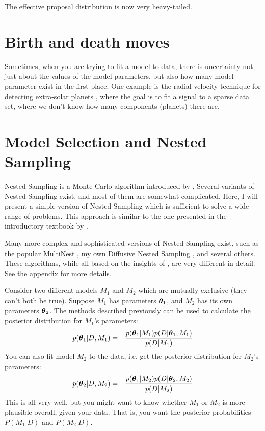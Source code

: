 The effective proposal distribution is now very heavy-tailed.



\section{Birth and death moves}
Sometimes, when you are trying to fit a model to data, there is uncertainty
not just about the values of the model parameters, but also how many model
parameter exist in the first place. One example is
the radial velocity technique for detecting extra-solar planets
\citep{gregory}, where the goal is to fit a signal to a sparse data set, where
we don't know how many components (planets) there are.



\section{Model Selection and Nested Sampling}
Nested Sampling is a Monte Carlo algorithm introduced by \citet{skilling}.
Several variants of Nested Sampling exist, and most of them are somewhat
complicated. Here, I will present a simple version of Nested Sampling which
is sufficient to solve a wide range of problems. This approach is similar to
the one presented in the introductory textbook by \citet{sivia}.

Many more complex and sophisticated versions of
Nested Sampling exist, such as the popular MultiNest \citep{multinest},
my own Diffusive Nested Sampling \citep{dnest}, and several others. These
algorithms, while all based on the insights of \citet{skilling}, are very
different in detail. See the appendix for more details.

Consider two different models $M_1$ and $M_2$ which are mutually exclusive
(they can't both be true).
Suppose $M_1$ has parameters
$\boldsymbol{\theta}_1$, and $M_2$ has its own parameters $\boldsymbol{\theta}_2$. The methods
described previously can be used to calculate the posterior distribution for
$M_1$'s parameters:
\begin{eqnarray}
p(\boldsymbol{\theta}_1 | D, M_1) &=& \frac{p(\boldsymbol{\theta}_1 | M_1)p(D | \boldsymbol{\theta}_1, M_1)}
{p(D | M_1)}
\end{eqnarray}
You can also fit model $M_2$ to the data, i.e. get the posterior distribution
for $M_2$'s parameters:
\begin{eqnarray}
p(\boldsymbol{\theta}_2 | D, M_2) &=& \frac{p(\boldsymbol{\theta}_1 | M_2)p(D | \boldsymbol{\theta}_2, M_2)}
{p(D | M_2)}
\end{eqnarray}
This is all very well, but you might want to know whether $M_1$ or $M_2$ is
more plausible overall, given your data. That is, you want the posterior
probabilities $P(M_1 | D)$ and $P(M_2 | D)$.

